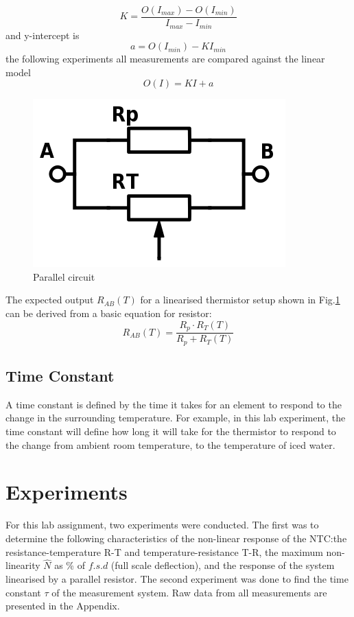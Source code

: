 \documentclass[a4,11pt]{article}
\begin{document}
$$K=\frac{O(I_{max})-O(I_{min})}{I_{max}-I_{min}}$$
and y-intercept is
\begin{equation}
  \label{eq:intercept}
  a=O(I_{min})-KI_{min}
\end{equation}
the following experiments all measurements are compared against the linear model
\begin{equation}
  O(I)=KI+a
\end{equation}
\begin{figure}[H]
  \label{fig:parallel}
  \centering
  \includegraphics[width=0.75\columnwidth]{parallel.png}
  \caption{
    Parallel circuit
  }
\end{figure}
The expected output $R_{AB}(T)$ for a linearised thermistor setup shown in Fig.\ref{fig:parallel} can be derived from a basic equation for resistor:
\begin{equation}
  \label{eq:Rab}
  R_{AB}(T)=\frac{R_p\cdot R_T(T)}{R_p+R_T(T)}
\end{equation}
\subsection{Time Constant}
A time constant is defined by the time it takes for an element to respond to the change in the surrounding temperature. For example, in this lab experiment, the time constant will define how long it will take for the thermistor to respond to the change from ambient room temperature, to the temperature of iced water.
\section{Experiments}
For this lab assignment, two experiments were conducted. The first was to determine the following characteristics of the non-linear response of the NTC:\@ the resistance-temperature R-T and temperature-resistance T-R, the maximum non-linearity $\hat N$ as \% of $f.s.d$ (full scale deflection), and the response of the system linearised by a parallel resistor. The second experiment was done to find the time constant $\tau$ of the measurement system. Raw data from all measurements are presented in the Appendix.
\end{document}

